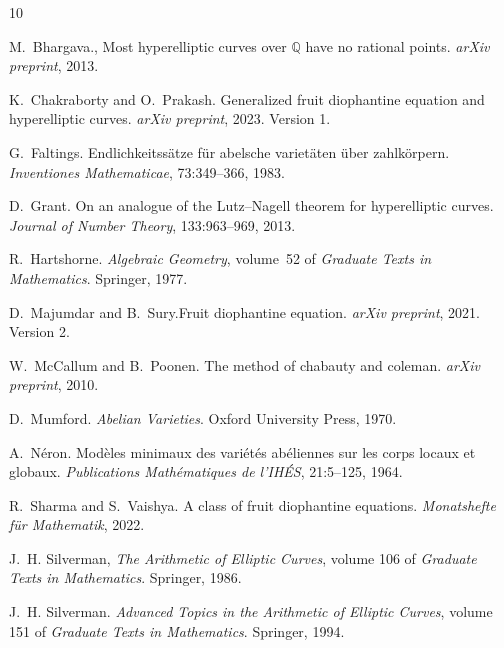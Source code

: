 \documentclass[12pt, reqno]{amsart}
\numberwithin{equation}{section}
\theoremstyle{definition}
\theoremstyle{nodefstyle}
\begin{document}
\begin{thebibliography}{10}

M.~Bhargava.,  Most hyperelliptic curves over $\mathbb{Q}$ have no rational points. {\em arXiv preprint}, 2013.

K.~Chakraborty and O.~Prakash.
 Generalized fruit diophantine equation and hyperelliptic curves.
 {\em arXiv preprint}, 2023. Version 1.

G.~Faltings. Endlichkeitss{\"a}tze f{\"u}r abelsche variet{\"a}ten {\"u}ber zahlk{\"o}rpern. {\em Inventiones Mathematicae}, 73:349--366, 1983.

D.~Grant.
 On an analogue of the {L}utz--{N}agell theorem for hyperelliptic curves. {\em Journal of Number Theory}, 133:963--969, 2013.

R.~Hartshorne. {\em Algebraic Geometry}, volume~52 of {\em Graduate Texts in Mathematics}. Springer, 1977.

D.~Majumdar and B.~Sury.Fruit diophantine equation. {\em arXiv preprint}, 2021. Version 2.

W.~McCallum and B.~Poonen. The method of chabauty and coleman. {\em arXiv preprint}, 2010.

D.~Mumford. {\em Abelian Varieties}. Oxford University Press, 1970.

A.~N{\'e}ron.  Mod\`eles minimaux des vari\'et\'es ab\'eliennes sur les corps locaux et globaux. {\em Publications Math{\'e}matiques de l'IH{\'E}S}, 21:5--125, 1964.

R.~Sharma and S.~Vaishya. A class of fruit diophantine equations.
 {\em Monatshefte f{\"u}r Mathematik}, 2022.

J.~H. Silverman, {\em The Arithmetic of Elliptic Curves}, volume 106 of {\em Graduate Texts in Mathematics}. Springer, 1986.

J.~H. Silverman. {\em Advanced Topics in the Arithmetic of Elliptic Curves}, volume 151 of {\em Graduate Texts in Mathematics}. Springer, 1994.

\end{thebibliography}
\end{document}
